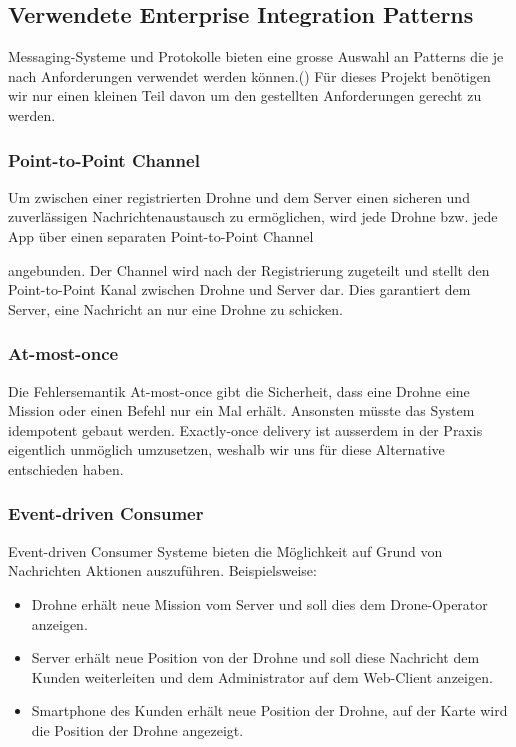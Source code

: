 {{\subsection{Verwendete Enterprise Integration Patterns}
Messaging-Systeme und Protokolle bieten eine grosse Auswahl an Patterns die je nach Anforderungen verwendet werden können.({\cite{EIP}}) Für dieses Projekt benötigen wir nur einen kleinen Teil davon um den gestellten Anforderungen gerecht zu werden.
%
\subsubsection{Point-to-Point Channel}
Um zwischen einer registrierten Drohne und dem Server einen sicheren und zuverlässigen Nachrichtenaustausch zu ermöglichen, wird jede Drohne bzw. jede App über einen separaten Point-to-Point Channel	\cite[S. 103]{EIP}} angebunden. Der Channel wird nach der Registrierung zugeteilt und stellt den Point-to-Point Kanal zwischen Drohne und Server dar. Dies garantiert dem Server, eine Nachricht an nur eine Drohne zu schicken.
%
\subsubsection{At-most-once}

Die Fehlersemantik At-most-once gibt die Sicherheit, dass eine Drohne eine Mission oder einen Befehl nur ein Mal erhält. Ansonsten müsste das System idempotent gebaut werden. Exactly-once delivery ist ausserdem in der Praxis eigentlich unmöglich umzusetzen, weshalb wir uns für diese Alternative entschieden haben. 
%
\subsubsection{Event-driven Consumer}
{Event-driven Consumer \cite[S. 442]{EIP}} Systeme bieten die Möglichkeit auf Grund von Nachrichten Aktionen auszuführen. Beispielsweise:
%
\begin{itemize}
	\item Drohne erhält neue Mission vom Server und soll dies dem Drone-Operator anzeigen.
	\item Server erhält neue Position von der Drohne und soll diese Nachricht dem Kunden weiterleiten und dem Administrator auf dem Web-Client anzeigen.
	\item Smartphone des Kunden erhält neue Position der Drohne, auf der Karte wird die Position der Drohne angezeigt.
\end{itemize}

}
